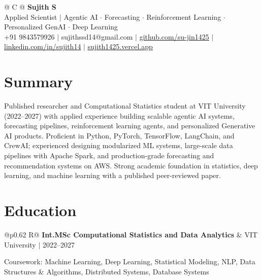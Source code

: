 \documentclass[a4paper,10pt]{article}
\newcommand{\ulink}[2]{\href{#1}{\uline{#2}}}
\newcommand{\subheading}[1]{{\color[HTML]{0A0A0A}\fontsize{12}{14}\selectfont\bfseries #1}}
\newcommand{\meta}[1]{{\color[HTML]{5C5C5C}\fontsize{10.5}{12.5}\selectfont #1}}
\begin{document}
\pagestyle{empty}

\begin{tabularx}{\linewidth}{@{} C @{}}
{\color[HTML]{000000}\fontsize{30}{35}\selectfont\bfseries Sujith S} \\[5pt]
{\fontsize{10.5}{12.5}\selectfont\color[HTML]{3A3A3A}
Applied Scientist $|$ Agentic AI $\cdot$ Forecasting $\cdot$ Reinforcement Learning $\cdot$ Personalized GenAI $\cdot$ Deep Learning} \\[6pt]
{\fontsize{10.5}{12.5}\selectfont\textcolor[HTML]{3A3A3A}{
+91 9843579926 $|$
sujithssd14@gmail.com $|$
\ulink{https://github.com/su-jin1425}{github.com/su-jin1425} $|$
\ulink{https://linkedin.com/in/sujith14}{linkedin.com/in/sujith14} $|$
\ulink{https://sujith1425.vercel.app}{sujith1425.vercel.app}}}
\end{tabularx}

\vspace{2pt}

\section{Summary}
\vspace{5pt}
{\color[HTML]{0A0A0A}\fontsize{11}{14}\selectfont
Published researcher and Computational Statistics student at VIT University (2022--2027) with applied experience building scalable agentic AI systems, forecasting pipelines, reinforcement learning agents, and personalized Generative AI products. Proficient in Python, PyTorch, TensorFlow, LangChain, and CrewAI; experienced designing modularized ML systems, large-scale data pipelines with Apache Spark, and production-grade forecasting and recommendation systems on AWS. Strong academic foundation in statistics, deep learning, and machine learning with a published peer-reviewed paper.}

\vspace{2pt}

\section{Education}
\vspace{2pt}

\begin{tabularx}{\linewidth}{@{}p{0.62\linewidth} R@{}}
\subheading{Int.MSc Computational Statistics and Data Analytics} & \meta{VIT University $|$ 2022--2027}
\end{tabularx}
\vspace{1pt}
{\color[HTML]{3A3A3A}\fontsize{11}{14}\selectfont Coursework: Machine Learning, Deep Learning, Statistical Modeling, NLP, Data Structures \& Algorithms, Distributed Systems, Database Systems}
\end{document}
